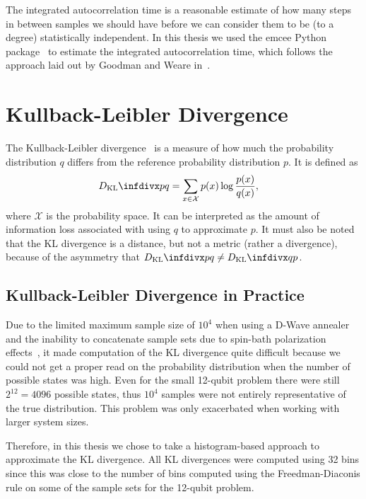 The integrated autocorrelation time is a reasonable estimate of how many steps in between samples we should have before we can consider them to be (to a degree) statistically independent.
In this thesis we used the emcee Python package~\cite{python_emcee} to estimate the integrated autocorrelation time, which follows the approach laid out by Goodman and Weare in~\cite{goodman_weare_2010}.

\section{Kullback-Leibler Divergence}\label{app:kl_divergence}
The Kullback-Leibler divergence~\cite{kullback_1951} is a measure of how much the probability distribution \( q \) differs from the reference probability distribution \( p \).
It is defined as
\begin{align}
    \DKL{p}{q}
        &= \sum_{x\in\mathcal{X}} p(x) \log\frac{p(x)}{q(x)},
\end{align}
where \( \mathcal{X} \) is the probability space.
It can be interpreted as the amount of information loss associated with using \( q \) to approximate \( p \).
It must also be noted that the KL divergence is a distance, but not a metric (rather a divergence), because of the asymmetry that \( \DKL{p}{q} \ne \DKL{q}{p} \).

\subsection{Kullback-Leibler Divergence in Practice}\label{app:kl_divergence_in_practice}
Due to the limited maximum sample size of \( 10^4 \) when using a D-Wave annealer and the inability to concatenate sample sets due to spin-bath polarization effects~\cite{pochart_2021}, it made computation of the KL divergence quite difficult because we could not get a proper read on the probability distribution when the number of possible states was high.
Even for the small 12-qubit problem there were still \( 2^{12} = 4096 \) possible states, thus \( 10^4 \) samples were not entirely representative of the true distribution.
This problem was only exacerbated when working with larger system sizes.

Therefore, in this thesis we chose to take a histogram-based approach to approximate the KL divergence.
All KL divergences were computed using 32 bins since this was close to the number of bins computed using the Freedman-Diaconis rule on some of the sample sets for the 12-qubit problem.

